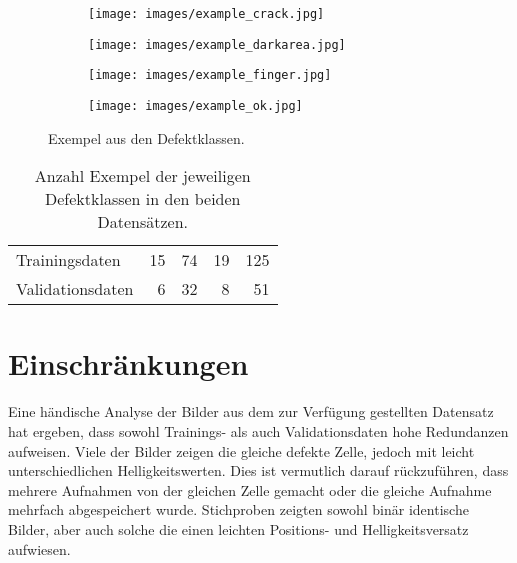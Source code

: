 \begin{figure}
    \centering
    \begin{subfigure}{0.245\textwidth}
        \texttt{[image: images/example\_crack.jpg]}
        \caption{}
    \end{subfigure}
    \begin{subfigure}{0.245\textwidth}
        \texttt{[image: images/example\_darkarea.jpg]}
        \caption{}
    \end{subfigure}
    \begin{subfigure}{0.245\textwidth}
        \texttt{[image: images/example\_finger.jpg]}
        \caption{}
    \end{subfigure}
    \begin{subfigure}{0.245\textwidth}
        \texttt{[image: images/example\_ok.jpg]}
        \caption{}
    \end{subfigure}
    \caption{Exempel aus den Defektklassen.\label{fig:example_defects}}
\end{figure}

\begin{table}
    \centering
    \caption{Anzahl Exempel der jeweiligen Defektklassen in den beiden Datensätzen.\label{tbl:datasets}}
    \begin{tabular}{l r r r r}
        \toprule
                         & {} & {} & {} & {} \\
        \midrule
        Trainingsdaten   & 15             & 74                & 19              & 125         \\
        Validationsdaten & 6              & 32                & 8               & 51          \\
        \bottomrule
    \end{tabular}
\end{table}

\section{Einschränkungen}

Eine händische Analyse der Bilder aus dem zur Verfügung gestellten Datensatz hat ergeben, dass sowohl Trainings- als auch Validationsdaten hohe Redundanzen aufweisen. Viele der Bilder zeigen die gleiche defekte Zelle, jedoch mit leicht unterschiedlichen Helligkeitswerten. Dies ist vermutlich darauf rückzuführen, dass mehrere Aufnahmen von der gleichen Zelle gemacht oder die gleiche Aufnahme mehrfach abgespeichert wurde. Stichproben zeigten sowohl binär identische Bilder, aber auch solche die einen leichten Positions- und Helligkeitsversatz aufwiesen.
